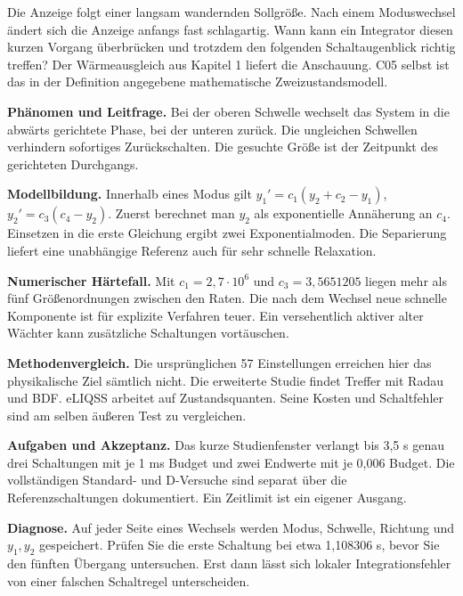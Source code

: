 Die Anzeige folgt einer langsam wandernden Sollgröße. Nach einem Moduswechsel ändert sich die Anzeige anfangs fast schlagartig. Wann kann ein Integrator diesen kurzen Vorgang überbrücken und trotzdem den folgenden Schaltaugenblick richtig treffen? Der Wärmeausgleich aus Kapitel 1 liefert die Anschauung. C05 selbst ist das in der Definition angegebene mathematische Zweizustandsmodell.
\par\textsf{\bfseries\color{sea}Phänomen und Leitfrage.} Bei der oberen Schwelle wechselt das System in die abwärts gerichtete Phase, bei der unteren zurück. Die ungleichen Schwellen verhindern sofortiges Zurückschalten. Die gesuchte Größe ist der Zeitpunkt des gerichteten Durchgangs.
\par\textsf{\bfseries\color{sea}Modellbildung.} Innerhalb eines Modus gilt \(y_1'=c_1(y_2+c_2-y_1)\), \(y_2'=c_3(c_4-y_2)\). Zuerst berechnet man \(y_2\) als exponentielle Annäherung an \(c_4\). Einsetzen in die erste Gleichung ergibt zwei Exponentialmoden. Die Separierung liefert eine unabhängige Referenz auch für sehr schnelle Relaxation.
\par\textsf{\bfseries\color{sea}Numerischer Härtefall.} Mit \(c_1=2{,}7\cdot10^6\) und \(c_3=3{,}5651205\) liegen mehr als fünf Größenordnungen zwischen den Raten. Die nach dem Wechsel neue schnelle Komponente ist für explizite Verfahren teuer. Ein versehentlich aktiver alter Wächter kann zusätzliche Schaltungen vortäuschen.
\par\textsf{\bfseries\color{sea}Methodenvergleich.} Die ursprünglichen 57 Einstellungen erreichen hier das physikalische Ziel sämtlich nicht. Die erweiterte Studie findet Treffer mit Radau und BDF. eLIQSS arbeitet auf Zustandsquanten. Seine Kosten und Schaltfehler sind am selben äußeren Test zu vergleichen.
\par\textsf{\bfseries\color{sea}Aufgaben und Akzeptanz.} Das kurze Studienfenster verlangt bis 3,5 s genau drei Schaltungen mit je 1 ms Budget und zwei Endwerte mit je 0,006 Budget. Die vollständigen Standard- und D-Versuche sind separat über die Referenzschaltungen dokumentiert. Ein Zeitlimit ist ein eigener Ausgang.
\par\textsf{\bfseries\color{sea}Diagnose.} Auf jeder Seite eines Wechsels werden Modus, Schwelle, Richtung und \(y_1,y_2\) gespeichert. Prüfen Sie die erste Schaltung bei etwa 1,108306 s, bevor Sie den fünften Übergang untersuchen. Erst dann lässt sich lokaler Integrationsfehler von einer falschen Schaltregel unterscheiden.


